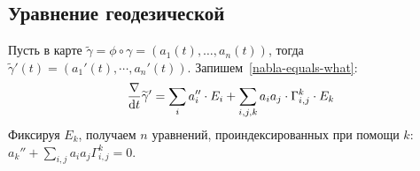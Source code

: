 \documentclass[a4paper]{report}
\begin{document}
    \subsection{Уравнение геодезической}
    Пусть в карте $\tilde{\gamma} = \phi \circ \gamma = (a_1(t), \dots, a_n(t))$, тогда $\tilde{\gamma}'(t) = (a_1'(t), \cdots, a_n'(t))$.
    Запишем~\eqref{nabla-equals-what}:\[\frac{\nabla}{\operatorname{d}\! t}\widetilde{\gamma}' = \sum\limits_{i}a_i'' \cdot E_i + \sum\limits_{i,j,k}a_i a_j \cdot \Gamma_{i,j}^{k} \cdot E_k\]
    Фиксируя $E_k$, получаем $n$ уравнений, проиндексированных при помощи $k$: $a_k'' + \sum\limits_{i,j}a_i a_j \Gamma_{i,j}^{k} = 0$.

\end{document}
